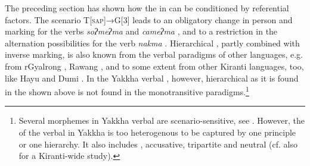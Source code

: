The preceding section has shown how the  in  can be conditioned by referential factors. The scenario  T[\textsc{sap}]→G[3]  leads to an obligatory change in  person and  marking for the verbs \emph{soʔmeʔma}  and \emph{cameʔma} , and to a restriction in the alternation possibilities for the verb \emph{nakma} . Hierarchical , partly combined with inverse marking, is also known from the verbal paradigms of other  languages, e.g. from rGyalrong \citep{Nagano1984A-historical}, Rawang \citep{LaPolla2007Hierarchical}, and to some extent from other Kiranti languages, too, like Hayu and Dumi \citep{Michailovsky2003Hayu, Driem1993A-grammar}. In the Yakkha verbal , however, hierarchical  as it is found in the  shown above is not found in the monotransitive paradigms.\footnote{Several morphemes in Yakkha verbal  are scenario-sensitive, see . However, the  of the verbal  in Yakkha is too heterogenous to be captured by one principle or one hierarchy. It also includes , accusative, tripartite and neutral  (cf. also \citet{Witzlacketal2011_Decomposing} for a Kiranti-wide study).}


 